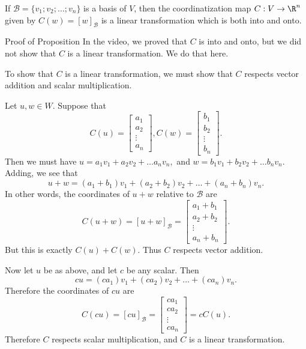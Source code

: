
{}  If $\mathcal{B}  = \{v_1; v_2; \ldots ; v_n\}$ is a basis of $V$, then the
coordinatization map $C: V \rightarrow \R^n$ given by $C(w) = [w]_{\mathcal{B}}$ is a linear transformation
which is both into and onto.

\begin{edXshowhide}{Proof of Proposition}
In the video, we proved that $C$ is into and onto, but we did not show that $C$ is a linear transformation.
We do that here.  

To show that $C$ is a linear transformation, we must show that $C$ respects vector addition and 
scalar multiplication.  

Let $u, w \in W$.  Suppose that
\[
C(u) = \left[ \begin{array}{c} a_1 \\ a_2 \\ \vdots \\ a_n \end{array} \right], 
C(w) = \left[ \begin{array}{c} b_1 \\ b_2 \\ \vdots \\ b_n \end{array} \right].\]
Then we must have $u = a_1v_1 + a_2v_2 + \ldots a_n v_n,$ and 
$w = b_1v_1 + b_2v_2 + \ldots b_n v_n.$  Adding, we see that
\[u+w = (a_1+b_1)v_1 + (a_2+b_2)v_2 + \ldots + (a_n+b_n)v_n.\]
In other words, the coordinates of $u+w$ relative to $\mathcal{B}$ are 
\[C(u+w) = [u+w]_{\mathcal{B}} = \left[ \begin{array}{c} a_1+b_1 \\ a_2+b_2 \\ \vdots \\ a_n+b_n \end{array} \right].\]
But this is exactly $C(u) + C(w)$.  Thus $C$ respects vector addition.  

Now let $u$ be as above, and let $c$ be any scalar.  Then 
\[cu = (ca_1)v_1 + (ca_2)v_2 + \ldots + (ca_n)v_n.\]
Therefore the coordinates of $cu$ are
\[C(cu) = [cu]_{\mathcal{B}} = \left[ \begin{array}{c} ca_1 \\ ca_2 \\ \vdots \\ ca_n \end{array} \right] =
cC(u).\]
Therefore $C$ respects scalar multiplication, and $C$ is a linear transformation.  




\end{edXshowhide}



